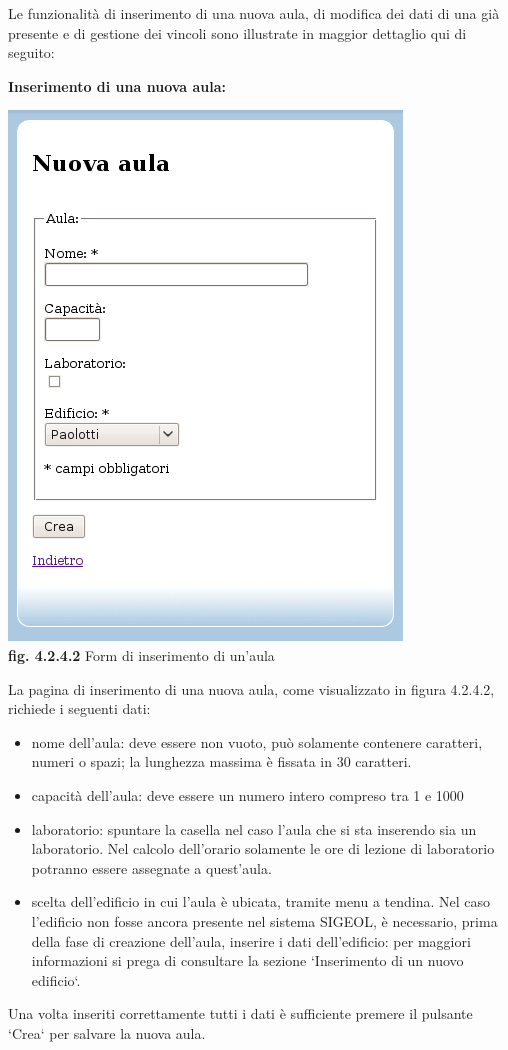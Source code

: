 \documentclass[11pt,a4paper]{article}
\begin{document}
Le funzionalità di inserimento di una nuova aula, di modifica dei dati di una già presente e di gestione dei vincoli sono illustrate in maggior dettaglio qui di seguito:
\newline \newline
\begin{large}\textbf{Inserimento di una nuova aula:}\end{large}

\bigskip
\begin{center}
	\includegraphics[scale=0.5]{images/nuova_aula.jpg}\\
	\textbf{fig. 4.2.4.2} Form di inserimento di un'aula\\
\end{center}
\bigskip

La pagina di inserimento di una nuova aula, come visualizzato in figura 4.2.4.2, richiede i seguenti dati:
\begin{itemize}
 \item nome dell'aula: deve essere non vuoto, può solamente contenere caratteri, numeri o spazi; la lunghezza massima è fissata in 30 caratteri. 
 \item capacità dell'aula: deve essere un numero intero compreso tra 1 e 1000
 \item laboratorio: spuntare la casella nel caso l'aula che si sta inserendo sia un laboratorio. Nel calcolo dell'orario solamente le ore di lezione di laboratorio potranno essere assegnate a quest'aula.
 \item scelta dell'edificio in cui l'aula è ubicata, tramite menu a tendina. Nel caso l'edificio non fosse ancora presente nel sistema SIGEOL, è necessario, prima della fase di creazione dell'aula, inserire i dati dell'edificio: per maggiori informazioni si prega di consultare la sezione `Inserimento di un nuovo edificio`.
\end{itemize}
Una volta inseriti correttamente tutti i dati è sufficiente premere il pulsante `Crea` per salvare la nuova aula.
\end{document}
